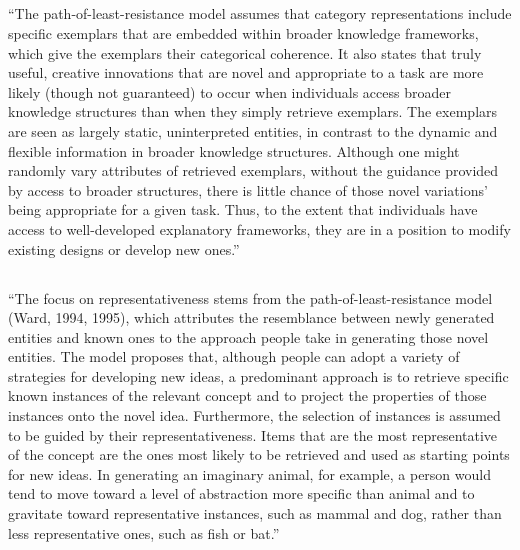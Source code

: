 \documentclass[12pt]{article}
\begin{document}
\subsection{\cite{ward1995s}}
\begin{displayquote}
``The path-of-least-resistance model assumes that category representations include specific exemplars that are embedded within broader knowledge frameworks, which give the exemplars their categorical coherence. It also states that truly useful, creative innovations that are novel and appropriate to a task are more likely (though not guaranteed) to occur when individuals access broader knowledge structures than when they simply retrieve exemplars. The exemplars are seen as largely static, uninterpreted entities, in contrast to the dynamic and flexible information in broader knowledge structures. Although one might randomly vary attributes of retrieved exemplars, without the guidance provided by access to broader structures, there is little chance of those novel variations' being appropriate for a given task. Thus, to the extent that individuals have access to well-developed explanatory frameworks, they are in a position to modify existing designs or develop new ones.''
\end{displayquote}

\subsection{\cite{ward2002role}}
\begin{displayquote}
``The focus on representativeness stems from the path-of-least-resistance model (Ward, 1994, 1995), which attributes the resemblance between newly generated entities and known ones to the approach people take in generating those novel entities. The model proposes that, although people can adopt a variety of strategies for developing new ideas, a predominant approach is to retrieve specific known instances of the relevant concept and to project the properties of those instances onto the novel idea. Furthermore, the selection of instances is assumed to be guided by their representativeness. Items that are the most representative of the concept are the ones most likely to be retrieved and used as starting points for new ideas. In generating an imaginary animal, for example, a person would tend to move toward a level of abstraction more specific than animal and to gravitate toward representative instances, such as mammal and dog, rather than less representative ones, such as fish or bat.''
\end{displayquote}
\end{document}
